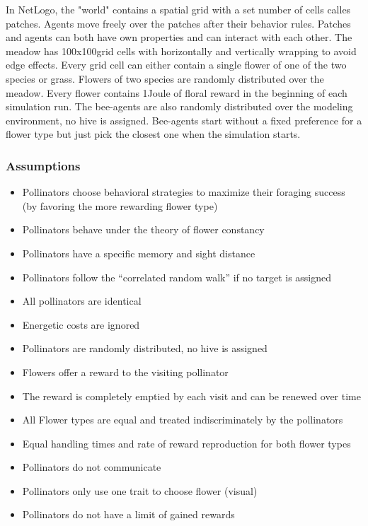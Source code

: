 In NetLogo, the "world" contains a spatial grid with a set number of cells calles patches. Agents move freely over the patches after their behavior rules. Patches and agents can both have own properties and can interact with each other. 
The meadow has 100x100grid cells with horizontally and vertically wrapping to avoid edge effects. Every grid cell can either contain a single flower of one of the two species or grass. Flowers of two species are randomly distributed over the meadow. Every flower contains 1Joule of floral reward in the beginning of each simulation run. The bee-agents are also randomly distributed over the modeling environment, no hive is assigned. Bee-agents start without a fixed preference for a flower type but just pick the closest one when the simulation starts. 

\subsubsection{Assumptions}

\begin{itemize}
\item	Pollinators choose behavioral strategies to maximize their foraging success (by favoring the more rewarding flower type)
\item	Pollinators behave under the theory of flower constancy
\item	Pollinators have a specific memory and sight distance
\item	Pollinators follow the “correlated random walk” if no target is assigned
\item	All pollinators are identical
\item	Energetic costs are ignored
\item	Pollinators are randomly distributed, no hive is assigned 
\item	Flowers offer a reward to the visiting pollinator
\item	The reward is completely emptied by each visit and can be renewed over time
\item	All Flower types are equal and treated indiscriminately by the pollinators
\item	Equal handling times and rate of reward reproduction for both flower types
\item	Pollinators do not communicate
\item	Pollinators only use one trait to choose flower (visual)
\item Pollinators do not have a limit of gained rewards
\end{itemize}


